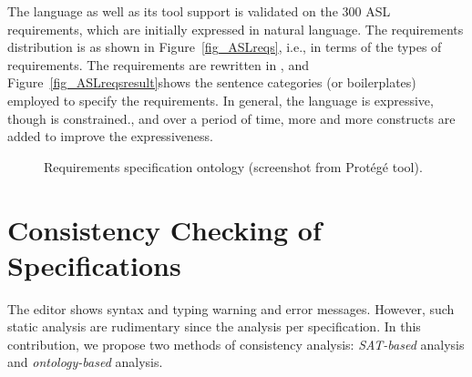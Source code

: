 The language as well as its tool support is validated on the 300 ASL requirements, which are initially expressed in natural language. The requirements distribution is as shown in Figure~\ref{fig_ASLreqs}, i.e., in terms of the types of requirements. The requirements are rewritten in \resa, and Figure~\ref{fig_ASLreqsresult}shows the sentence categories (or boilerplates) employed to specify the requirements. In general, the language is expressive,  though is constrained., and over a period of time, more and more constructs are added to improve the expressiveness.
 \begin{figure}[h] 
 	\centering
 	 \hfill
 	\caption{Requirements specification ontology (screenshot from Prot\'eg\'e tool).} \label{fig_ontology}
 \end{figure}
\section{Consistency Checking of \resa{} Specifications}\label{rc_resaanalysis}
The editor shows syntax and typing warning and error messages. However, such static analysis are rudimentary since the analysis per specification. In this contribution, we propose two methods of consistency analysis: \textit{SAT-based} analysis and \textit{ontology-based} analysis. 


